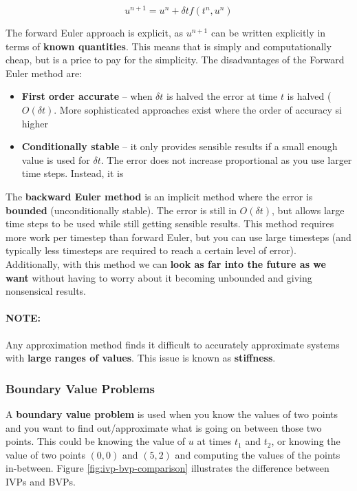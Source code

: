 \documentclass{article}
\begin{document}
\begin{equation}
	u^{n + 1} = u^n + \delta t f(t^n, u^n)
		\label{eq:ode-ivp-forward-euler}
\end{equation}

The forward Euler approach is explicit, as $u^{n+1}$ can be written explicitly in terms of \textbf{known quantities}. This means that is simply and computationally cheap, but is a price to pay for the simplicity. The disadvantages of the Forward Euler method are:
\begin{itemize}
	\item \textbf{First order accurate} -- when $\delta t$ is halved the error at time $t$ is halved ($O(\delta t)$. More sophisticated approaches exist where the order of accuracy si higher
	\item \textbf{Conditionally stable} -- it only provides sensible results if a small enough value is used for $\delta t$. The error does not increase proportional as you use larger time steps. Instead, it is 
\end{itemize}

The \textbf{backward Euler method} is an implicit method where the error is \textbf{bounded} (unconditionally stable). The error is still in $O(\delta t)$, but allows large time steps to be used while still getting sensible results. This method requires more work per timestep than forward Euler, but you can use large timesteps (and typically less timesteps are required to reach a certain level of error). Additionally, with this method we can \textbf{look as far into the future as we want} without having to worry about it becoming unbounded and giving nonsensical results.

\paragraph{\textbf{NOTE: }} Any approximation method finds it difficult to accurately approximate systems with \textbf{large ranges of values}. This issue is known as \textbf{stiffness}.

\subsubsection{Boundary Value Problems}
\label{sec:bvp}

A \textbf{boundary value problem} is used when you know the values of two points and you want to find out/approximate what is going on between those two points. This could be knowing the value of $u$ at times $t_1$ and $t_2$, or knowing the value of two points $(0, 0)$ and $(5, 2)$ and computing the values of the points in-between. Figure \ref{fig:ivp-bvp-comparison} illustrates the difference between IVPs and BVPs.
\end{document}
